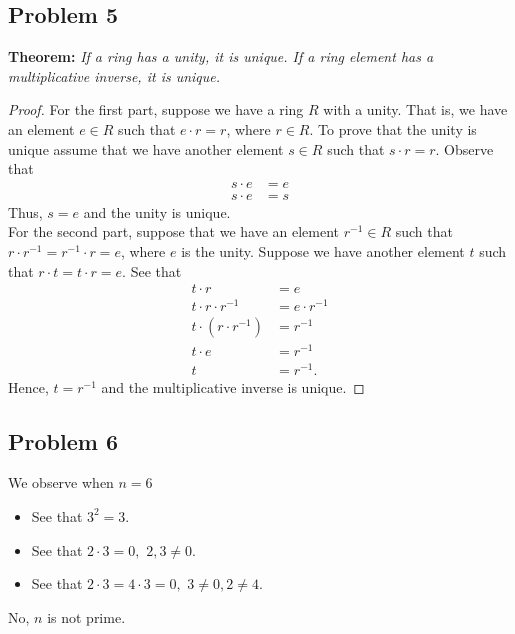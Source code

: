 \documentclass[a4paper,12pt]{article}
\begin{document}
\subsection*{Problem 5}
\begin{center}
    \textbf{Theorem: }\textit{If a ring has a unity, it is unique. If a ring element has a multiplicative inverse, it is unique.}
\end{center}
\begin{proof}
    For the first part, suppose we have a ring $R$ with a unity. That is, we have an element $e \in R$ such that $e\cdot r=r$, where $r \in R.$ To prove that the unity is unique assume that we have another element $s \in R$ such that $s\cdot r=r.$ Observe that 
    \begin{align*}
        s \cdot e &=e \\
        s \cdot e &=s
    \end{align*} 
    Thus, $s=e$ and the unity is unique.
   \\ For the second part, suppose that we have an element $r^{-1} \in R$ such that $r \cdot r^{-1} =r^{-1}\cdot r= e$, where $e$ is the unity. Suppose we have another element $t$ such that $r \cdot t= t \cdot r=e.$ See that 
\begin{align*}
    t \cdot r &=e\\
    t \cdot r \cdot r^{-1}&=e \cdot r^{-1}\\
    t \cdot (r \cdot r^{-1})&=r^{-1}\\
    t \cdot e &= r^{-1}\\
    t &= r^{-1}.
\end{align*}
Hence, $t = r^{-1}$ and the multiplicative inverse is unique.

\end{proof}
\subsection*{Problem 6}
We observe when $n=6$
\begin{itemize}
    \item See that $3^2=3.$
    \item See that $2 \cdot 3 =0,$ $2,3 \ne 0.$
    \item See that $2 \cdot 3 = 4 \cdot 3 =0,$ $3 \ne 0, 2 \ne 4.$
\end{itemize}
No, $n$ is not prime.
\end{document}
